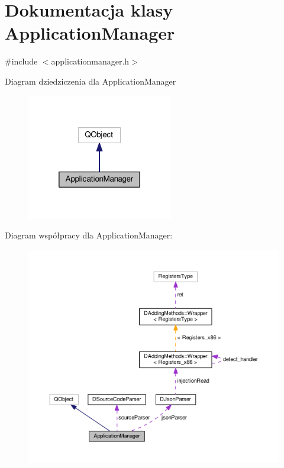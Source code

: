 \hypertarget{class_application_manager}{\section{Dokumentacja klasy Application\-Manager}
\label{class_application_manager}
}


{\ttfamily \#include $<$applicationmanager.\-h$>$}



Diagram dziedziczenia dla Application\-Manager
\nopagebreak
\begin{figure}[H]
\begin{center}
\leavevmode
\includegraphics[width=180pt]{class_application_manager__inherit__graph}
\end{center}
\end{figure}


Diagram współpracy dla Application\-Manager\-:
\nopagebreak
\begin{figure}[H]
\begin{center}
\leavevmode
\includegraphics[width=350pt]{class_application_manager__coll__graph}
\end{center}
\end{figure}
